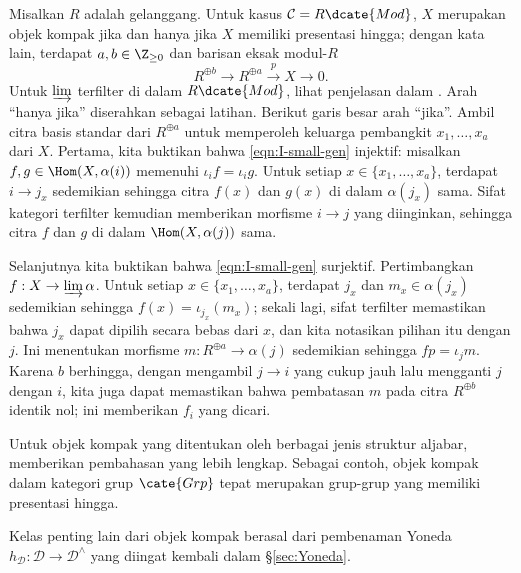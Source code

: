 \begin{example}\label{eg:Mod-cpt}
	Misalkan $R$ adalah gelanggang. Untuk kasus $\mathcal{C} = R\dcate{Mod}$, $X$ merupakan objek kompak jika dan hanya jika $X$ memiliki presentasi hingga; dengan kata lain, terdapat $a, b \in \Z_{\geq 0}$ dan barisan eksak modul-$R$
	\[ R^{\oplus b} \to R^{\oplus a} \xrightarrow{p} X \to 0 .\]
	Untuk $\varinjlim$ terfilter di dalam $R\dcate{Mod}$, lihat penjelasan dalam \cite[Catatan 6.2.3]{Li1}. Arah ``hanya jika'' diserahkan sebagai latihan. Berikut garis besar arah ``jika''. Ambil citra basis standar dari $R^{\oplus a}$ untuk memperoleh keluarga pembangkit $x_1, \ldots, x_a$ dari $X$. Pertama, kita buktikan bahwa \eqref{eqn:I-small-gen} injektif: misalkan $f, g \in \Hom(X, \alpha(i))$ memenuhi $\iota_i f = \iota_i g$. Untuk setiap $x \in \{x_1, \ldots, x_a \}$, terdapat $i \to j_x$ sedemikian sehingga citra $f(x)$ dan $g(x)$ di dalam $\alpha(j_x)$ sama. Sifat kategori terfilter kemudian memberikan morfisme $i \to j$ yang diinginkan, sehingga citra $f$ dan $g$ di dalam $\Hom(X, \alpha(j))$ sama.

	Selanjutnya kita buktikan bahwa \eqref{eqn:I-small-gen} surjektif. Pertimbangkan $f: X \to \varinjlim \alpha$. Untuk setiap $x \in \{x_1, \ldots, x_a \}$, terdapat $j_x$ dan $m_x \in \alpha(j_x)$ sedemikian sehingga $f(x) = \iota_{j_x}(m_x)$; sekali lagi, sifat terfilter memastikan bahwa $j_x$ dapat dipilih secara bebas dari $x$, dan kita notasikan pilihan itu dengan $j$. Ini menentukan morfisme $m: R^{\oplus a} \to \alpha(j)$ sedemikian sehingga $fp = \iota_j m$. Karena $b$ berhingga, dengan mengambil $j \to i$ yang cukup jauh lalu mengganti $j$ dengan $i$, kita juga dapat memastikan bahwa pembatasan $m$ pada citra $R^{\oplus b}$ identik nol; ini memberikan $f_i$ yang dicari.
\end{example}

Untuk objek kompak yang ditentukan oleh berbagai jenis struktur aljabar, \cite[Contoh 1.2; Teorema 3.12]{AR94} memberikan pembahasan yang lebih lengkap. Sebagai contoh, objek kompak dalam kategori grup $\cate{Grp}$ tepat merupakan grup-grup yang memiliki presentasi hingga.

Kelas penting lain dari objek kompak berasal dari pembenaman Yoneda $h_{\mathcal{D}}: \mathcal{D} \to \mathcal{D}^\wedge$ yang diingat kembali dalam \S\ref{sec:Yoneda}.


